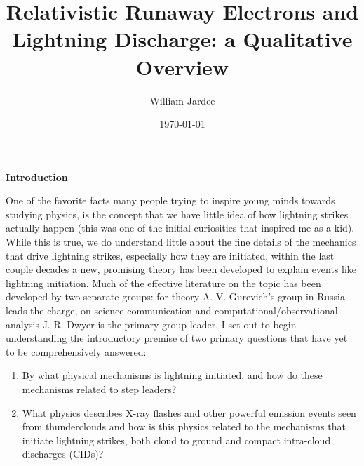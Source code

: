 \documentclass[11pt]{article}
\begin{document}
\graphicspath{{images/}}

\title{Relativistic Runaway Electrons and Lightning Discharge: a Qualitative Overview}
\author{William Jardee}
\date{\today}
\maketitle


\begin{multicols*}{2}
    

    \noindent
{\bf \LARGE Introduction}

    One of the favorite facts many people trying to inspire young minds towards studying physics, is the concept that we have little idea of how lightning strikes actually happen (this was one of the initial curiosities that inspired me as a kid). While this is true, we do understand little about the fine details of the mechanics that drive lightning strikes, especially how they are initiated, within the last couple decades a new, promising theory has been developed to explain events like lightning initiation. Much of the effective literature on the topic has been developed by two separate groups: for theory A. V. Gurevich's group in Russia leads the charge, on science communication and computational/observational analysis J. R. Dwyer is the primary group leader. I set out to begin understanding the introductory premise of two primary questions that have yet to be comprehensively answered:
    \begin{enumerate}
            \item By what physical mechanisms is lightning initiated, and how do these mechanisms related to step leaders?
            \item What physics describes X-ray flashes and other powerful emission events seen from thunderclouds and how is this physics related to the mechanisms that initiate lightning strikes, both cloud to ground and compact intra-cloud discharges (CIDs)? 
    \end{enumerate}


\end{multicols*}
\end{document}
